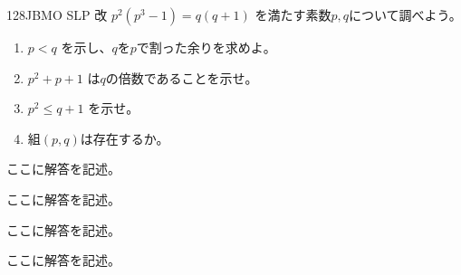 \begin{thm}{128}{}{JBMO SLP 改}
 $p^2(p^3-1)=q(q+1)$ を満たす素数$p, q$について調べよう。
 \begin{enumerate}
  \item $p<q$ を示し、$q$を$p$で割った余りを求めよ。
  \item $p^2+p+1$ は$q$の倍数であることを示せ。
  \item $p^2\le q+1$ を示せ。
  \item 組$(p,q)$は存在するか。
 \end{enumerate}
\end{thm}

ここに解答を記述。

ここに解答を記述。

ここに解答を記述。

ここに解答を記述。